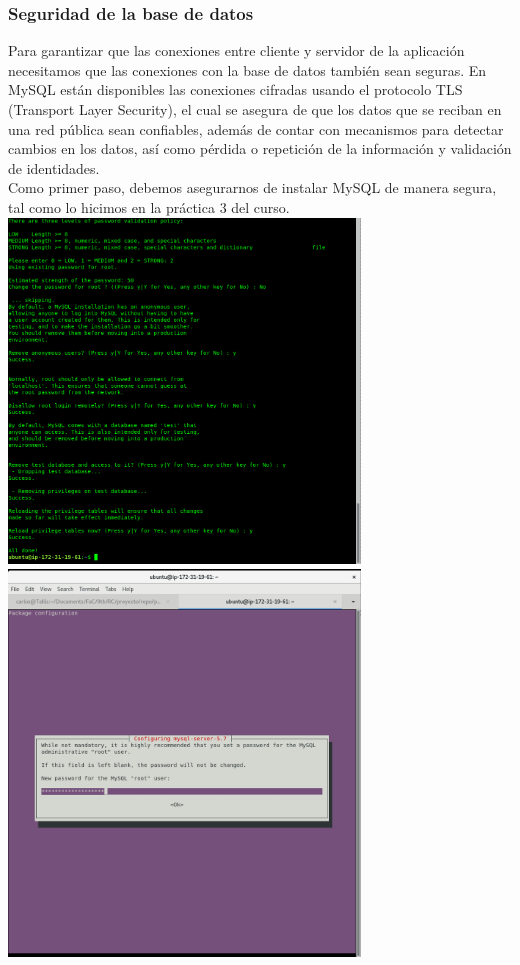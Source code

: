 \documentclass[9pt]{article}
\begin{document}

\subsubsection*{Seguridad de la base de datos}
Para garantizar que las conexiones entre cliente y servidor de la aplicación necesitamos que las conexiones con la base de datos también sean seguras. En \textsf{MySQL} están disponibles las conexiones cifradas usando el protocolo \textsf{TLS} (Transport Layer Security), el cual se asegura de que los datos que se reciban en una red pública sean confiables, además de contar con mecanismos para detectar cambios en los datos, así como pérdida o repetición de la información y validación de identidades. \\

Como primer paso, debemos asegurarnos de instalar \textsf{MySQL} de manera segura, tal como lo hicimos en la práctica 3 del curso. \\
\includegraphics[width=0.7\textwidth]{mysql_secure_installation} \\
\includegraphics[width=0.7\textwidth]{mysql_install}\\
\end{document}
